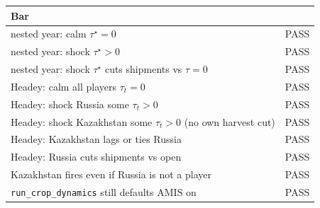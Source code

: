 \begin{center}
\small
{}
\label{tab:bars}
\begin{tabular}{lc}
\toprule
Bar & \\
\midrule
nested year: calm \(\tau^\star=0\) & PASS \\
nested year: shock \(\tau^\star>0\) & PASS \\
nested year: shock \(\tau^\star\) cuts shipments vs \(\tau=0\) & PASS \\
Headey: calm all players \(\tau_t=0\) & PASS \\
Headey: shock Russia some \(\tau_t>0\) & PASS \\
Headey: shock Kazakhstan some \(\tau_t>0\) (no own harvest cut) & PASS \\
Headey: Kazakhstan lags or ties Russia & PASS \\
Headey: Russia cuts shipments vs open & PASS \\
Kazakhstan fires even if Russia is not a player & PASS \\
\texttt{run\_crop\_dynamics} still defaults AMIS on & PASS \\
\bottomrule
\end{tabular}
\end{center}
\vspace{0.6em}

